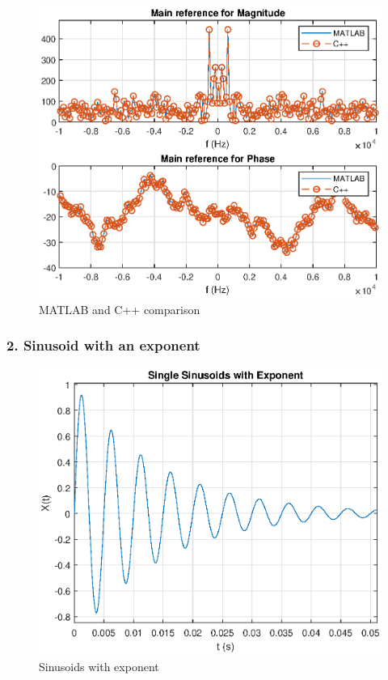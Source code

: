 \begin{figure}[h]
	\centering
	\includegraphics[width=12cm]{./algorithms/fft/figures/random_noise_fft.eps}
	\caption{MATLAB and C++ comparison}\label{random_noise_fft}
\end{figure}

\newpage
\subsubsection{2. Sinusoid with an exponent}

\begin{figure}[h]
	\centering
	\includegraphics[width=12cm]{./algorithms/fft/figures/Single_sinusoid.eps}
	\caption{Sinusoids with exponent}\label{Single_sinusoid}
\end{figure}

